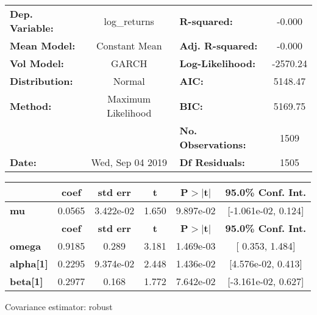\begin{center}
\begin{tabular}{lclc}
\toprule
\textbf{Dep. Variable:} &    log\_returns    & \textbf{  R-squared:         } &    -0.000   \\
\textbf{Mean Model:}    &   Constant Mean    & \textbf{  Adj. R-squared:    } &    -0.000   \\
\textbf{Vol Model:}     &       GARCH        & \textbf{  Log-Likelihood:    } &   -2570.24  \\
\textbf{Distribution:}  &       Normal       & \textbf{  AIC:               } &    5148.47  \\
\textbf{Method:}        & Maximum Likelihood & \textbf{  BIC:               } &    5169.75  \\
\textbf{}               &                    & \textbf{  No. Observations:  } &    1509     \\
\textbf{Date:}          &  Wed, Sep 04 2019  & \textbf{  Df Residuals:      } &    1505     \\
\bottomrule
\end{tabular}
\begin{tabular}{lccccc}
            & \textbf{coef} & \textbf{std err} & \textbf{t} & \textbf{P$> |$t$|$} & \textbf{95.0\% Conf. Int.}  \\
\midrule
\textbf{mu} &       0.0565  &    3.422e-02     &     1.650  &      9.897e-02       &    [-1.061e-02,  0.124]     \\
                  & \textbf{coef} & \textbf{std err} & \textbf{t} & \textbf{P$> |$t$|$} & \textbf{95.0\% Conf. Int.}  \\
\midrule
\textbf{omega}    &       0.9185  &        0.289     &     3.181  &      1.469e-03       &     [  0.353,  1.484]       \\
\textbf{alpha[1]} &       0.2295  &    9.374e-02     &     2.448  &      1.436e-02       &    [4.576e-02,  0.413]      \\
\textbf{beta[1]}  &       0.2977  &        0.168     &     1.772  &      7.642e-02       &    [-3.161e-02,  0.627]     \\
\bottomrule
\end{tabular}
\end{center}

Covariance estimator: robust
